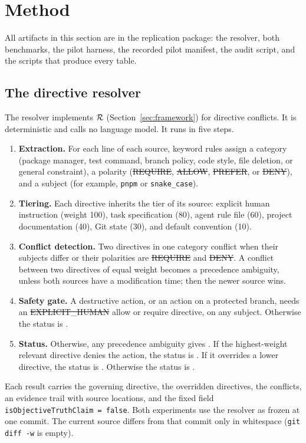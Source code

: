 \section{Method}
\label{sec:method}

All artifacts in this section are in the replication package: the resolver, both benchmarks, the pilot harness, the recorded pilot manifest, the audit script, and the scripts that produce every table.

\subsection{The directive resolver}
\label{sec:method-resolver}
The resolver implements $\mathcal{R}$ (Section~\ref{sec:framework}) for directive conflicts. It is deterministic and calls no language model. It runs in five steps.
\begin{enumerate}
    \item \textbf{Extraction.} For each line of each source, keyword rules assign a category (package manager, test command, branch policy, code style, file deletion, or general constraint), a polarity (\st{REQUIRE}, \st{ALLOW}, \st{PREFER}, or \st{DENY}), and a subject (for example, \texttt{pnpm} or \texttt{snake\_case}).
    \item \textbf{Tiering.} Each directive inherits the tier of its source: explicit human instruction (weight 100), task specification (80), agent rule file (60), project documentation (40), Git state (30), and default convention (10).
    \item \textbf{Conflict detection.} Two directives in one category conflict when their subjects differ or their polarities are \st{REQUIRE} and \st{DENY}. A conflict between two directives of equal weight becomes a precedence ambiguity, unless both sources have a modification time; then the newer source wins.
    \item \textbf{Safety gate.} A destructive action, or an action on a protected branch, needs an \st{EXPLICIT\_HUMAN} allow or require directive, on any subject. Otherwise the status is \sRA{}.
    \item \textbf{Status.} Otherwise, any precedence ambiguity gives \sAMB{}. If the highest-weight relevant directive denies the action, the status is \sBC{}. If it overrides a lower directive, the status is \sPWO{}. Otherwise the status is \sP{}.
\end{enumerate}
Each result carries the governing directive, the overridden directives, the conflicts, an evidence trail with source locations, and the fixed field \texttt{isObjectiveTruthClaim = false}. Both experiments use the resolver as frozen at one commit. The current source differs from that commit only in whitespace (\texttt{git diff -w} is empty).

